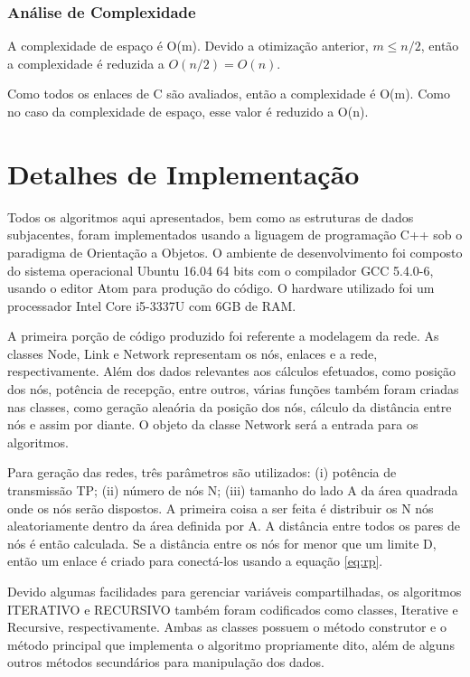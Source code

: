 \subsubsection{Análise de Complexidade}

A complexidade de espaço é O(m). Devido a otimização anterior, $m \leq n/2$, então a complexidade é reduzida a $O(n/2)=O(n)$. 

Como todos os enlaces de C são avaliados, então a complexidade é O(m). Como no caso da complexidade de espaço, esse valor é reduzido a O(n).

\section{Detalhes de Implementação}

Todos os algoritmos aqui apresentados, bem como as estruturas de dados subjacentes, foram implementados usando a liguagem de programação C++ sob o paradigma de Orientação a Objetos. O ambiente de desenvolvimento foi composto do sistema operacional Ubuntu 16.04 64 bits com o compilador GCC 5.4.0-6, usando o editor Atom para produção do código. O hardware utilizado foi um processador Intel Core i5-3337U com 6GB de RAM.

A primeira porção de código produzido foi referente a modelagem da rede. As classes Node, Link e Network representam os nós, enlaces e a rede, respectivamente. Além dos dados relevantes aos cálculos efetuados, como posição dos nós, potência de recepção, entre outros, várias funções também foram criadas nas classes, como geração aleaória da posição dos nós, cálculo da distância entre nós e assim por diante. O objeto da classe Network será a entrada para os algoritmos. 

Para geração das redes, três parâmetros são utilizados: (i) potência de transmissão TP; (ii) número de nós N; (iii) tamanho do lado A da área quadrada onde os nós serão dispostos. A primeira coisa a ser feita é distribuir os N nós aleatoriamente dentro da área definida por A. A distância entre todos os pares de nós é então calculada. Se a distância entre os nós for menor que um limite D, então um enlace é criado para conectá-los usando a equação \ref{eq:rp}.  

Devido algumas facilidades para gerenciar variáveis compartilhadas, os algoritmos ITERATIVO e RECURSIVO também foram codificados como classes, Iterative e Recursive, respectivamente. Ambas as classes possuem o método construtor e o método principal que implementa o algoritmo propriamente dito, além de alguns outros métodos secundários para manipulação dos dados.

